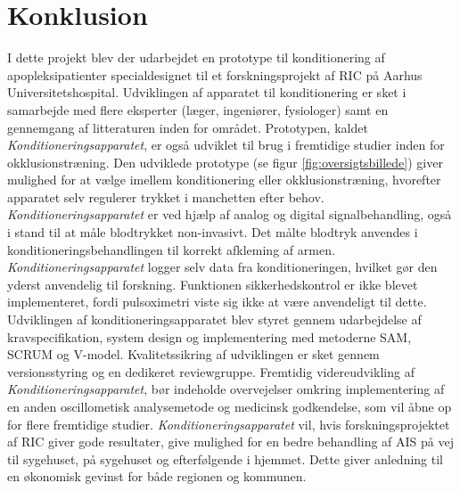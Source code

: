 \chapter{Konklusion}
I dette projekt blev der udarbejdet en prototype til konditionering af apopleksipatienter specialdesignet til et forskningsprojekt af RIC på Aarhus Universitetshospital. Udviklingen af apparatet til konditionering er sket i samarbejde med flere eksperter (læger, ingeniører, fysiologer) samt en gennemgang af litteraturen inden for området. Prototypen, kaldet \textit{Konditioneringsapparatet}, er også udviklet til brug i fremtidige studier inden for okklusionstræning.
Den udviklede prototype (se figur \ref{fig:oversigtsbillede}) giver mulighed for at vælge imellem konditionering eller okklusionstræning, hvorefter apparatet selv regulerer trykket i manchetten efter behov. \textit{Konditioneringsapparatet} er ved hjælp af analog og digital signalbehandling, også i stand til at måle blodtrykket non-invasivt. Det målte blodtryk anvendes i konditioneringsbehandlingen til korrekt afkleming af armen. \textit{Konditioneringsapparatet} logger selv data fra konditioneringen, hvilket gør den yderst anvendelig til forskning. Funktionen sikkerhedskontrol er ikke blevet implementeret, fordi pulsoximetri viste sig ikke at være anvendeligt til dette.
Udviklingen af konditioneringsapparatet blev styret gennem udarbejdelse af kravspecifikation, system design og implementering med metoderne SAM, SCRUM og V-model. Kvalitetssikring af udviklingen er sket gennem versionsstyring og en dedikeret reviewgruppe.
Fremtidig videreudvikling af \textit{Konditioneringsapparatet}, bør indeholde overvejelser omkring implementering af en anden oscillometisk analysemetode og medicinsk godkendelse, som vil åbne op for flere fremtidige studier.
\textit{Konditioneringsapparatet} vil, hvis forskningsprojektet af RIC giver gode resultater, give mulighed for en bedre behandling af AIS på vej til sygehuset, på sygehuset og efterfølgende i hjemmet. Dette giver anledning til en økonomisk gevinst for både regionen og kommunen. 

\label{SidsteSide}





